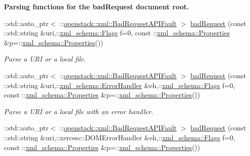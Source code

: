\begin{Indent}{\bf Parsing functions for the badRequest document root.}\par
\begin{DoxyCompactItemize}
\item 
::std::auto\_\-ptr$<$ ::\hyperlink{classopenstack_1_1xml_1_1BadRequestAPIFault}{openstack::xml::BadRequestAPIFault} $>$ \hyperlink{namespaceopenstack_1_1xml_acdb8438f859713271ab3a0a0a7d76680}{badRequest} (const ::std::string \&uri,::\hyperlink{namespacexml__schema_affb4c227cbd9aa7453dd1dc5a1401943}{xml\_\-schema::Flags} f=0, const ::\hyperlink{namespacexml__schema_ad27ce19a7ee1d3b1064092648898f64c}{xml\_\-schema::Properties} \&p=::\hyperlink{namespacexml__schema_ad27ce19a7ee1d3b1064092648898f64c}{xml\_\-schema::Properties}())
\begin{DoxyCompactList}\small\item\em Parse a URI or a local file. \item\end{DoxyCompactList}\item 
::std::auto\_\-ptr$<$ ::\hyperlink{classopenstack_1_1xml_1_1BadRequestAPIFault}{openstack::xml::BadRequestAPIFault} $>$ \hyperlink{namespaceopenstack_1_1xml_af143e34717d4b06ef7164f589922507a}{badRequest} (const ::std::string \&uri,::\hyperlink{namespacexml__schema_ab1c9361bfd3b404eaabf0c31eded79dc}{xml\_\-schema::ErrorHandler} \&eh,::\hyperlink{namespacexml__schema_affb4c227cbd9aa7453dd1dc5a1401943}{xml\_\-schema::Flags} f=0, const ::\hyperlink{namespacexml__schema_ad27ce19a7ee1d3b1064092648898f64c}{xml\_\-schema::Properties} \&p=::\hyperlink{namespacexml__schema_ad27ce19a7ee1d3b1064092648898f64c}{xml\_\-schema::Properties}())
\begin{DoxyCompactList}\small\item\em Parse a URI or a local file with an error handler. \item\end{DoxyCompactList}\item 
::std::auto\_\-ptr$<$ ::\hyperlink{classopenstack_1_1xml_1_1BadRequestAPIFault}{openstack::xml::BadRequestAPIFault} $>$ \hyperlink{namespaceopenstack_1_1xml_a804005cbfe8d53de3badf45f094680ec}{badRequest} (const ::std::string \&uri,::xercesc::DOMErrorHandler \&eh,::\hyperlink{namespacexml__schema_affb4c227cbd9aa7453dd1dc5a1401943}{xml\_\-schema::Flags} f=0, const ::\hyperlink{namespacexml__schema_ad27ce19a7ee1d3b1064092648898f64c}{xml\_\-schema::Properties} \&p=::\hyperlink{namespacexml__schema_ad27ce19a7ee1d3b1064092648898f64c}{xml\_\-schema::Properties}())

\end{DoxyCompactItemize}
\end{Indent}
